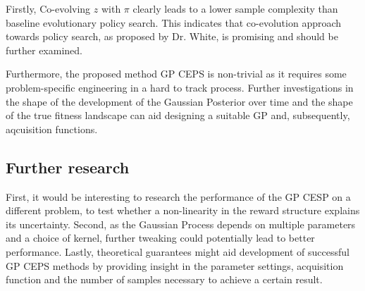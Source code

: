Firstly, Co-evolving $z$ with $\pi$ clearly leads to a lower sample complexity than baseline evolutionary policy search. This indicates that co-evolution approach towards policy search, as proposed by Dr. White, is promising and should be further examined.

Furthermore, the proposed method GP CEPS is non-trivial as it requires some problem-specific engineering in a hard to track process. Further investigations in the shape of the development of the Gaussian Posterior over time and the shape of the true fitness landscape can aid designing a suitable GP and, subsequently, aqcuisition functions. 

\subsection{Further research}
First, it would be interesting to research the performance of the GP CESP on a different problem, to test whether a non-linearity in the reward structure explains its uncertainty. Second, as the Gaussian Process depends on multiple parameters and a choice of kernel, further tweaking could potentially lead to better performance. Lastly, theoretical guarantees might aid development of successful GP CEPS methods by providing insight in the parameter settings, acquisition function and the number of samples necessary to achieve a certain result.

